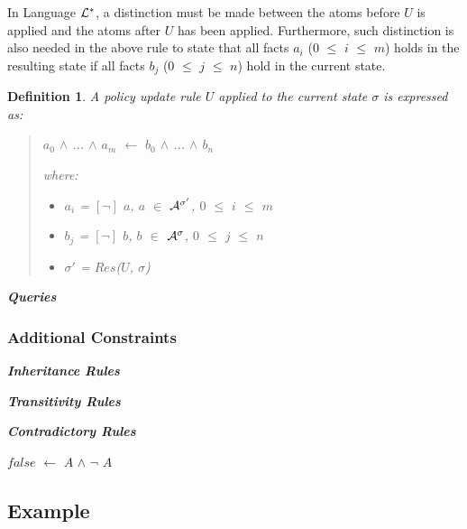 \documentclass[10pt, twocolumn]{article}
\newtheorem{definition}{Definition}
\begin{document}
          In Language ${\cal L}^{*}$, a distinction must be made between the
          atoms before $U$ is applied and the atoms after $U$ has been applied.
          Furthermore, such distinction is also needed in the above rule to
          state that all facts $a_{i}$ ($0$ $\leq$ $i$ $\leq$ $m$) holds in
          the resulting state if all facts $b_{j}$ ($0$ $\leq$ $j$ $\leq$ $n$)
          hold in the current state.

          \begin{definition}
            A policy update rule $U$ applied to the current state $\sigma$ is
            expressed as:

            \begin{quote}
              $a_{0}$ $\land$ ... $\land$ $a_{m}$ $\leftarrow$ $b_{0}$ $\land$ ... $\land$ $b_{n}$

              where:

              \begin{itemize}
                \item
                  $a_{i}$ = $[\lnot]$ $a$, $a$ $\in$ ${\cal A}^{\sigma'}$, $0$ $\leq$ $i$ $\leq$ $m$
                \item
                  $b_{j}$ = $[\lnot]$ $b$, $b$ $\in$ ${\cal A}^{\sigma}$, $0$ $\leq$ $j$ $\leq$ $n$
                \item
                  $\sigma'$ = $Res$($U$, $\sigma$)
              \end{itemize}
            \end{quote}
          \end{definition}

        \noindent \textbf{\emph{Queries}}

      \subsubsection{Additional Constraints}

        \noindent \textbf{\emph{Inheritance Rules}}

        \noindent \textbf{\emph{Transitivity Rules}}

        \noindent \textbf{\emph{Contradictory Rules}}

          $false$ $\leftarrow$ $A$ $\land$ $\lnot$ $A$

    \subsection{Example}
\end{document}
